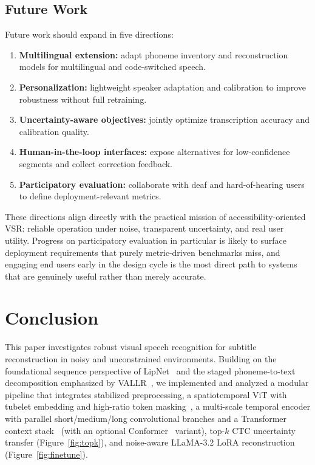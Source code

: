 \documentclass[10pt,twocolumn,letterpaper]{article}
\begin{document}
\subsection{Future Work}
Future work should expand in five directions:
\begin{enumerate}[leftmargin=*]
    \item \textbf{Multilingual extension:} adapt phoneme inventory and reconstruction models for multilingual and code-switched speech.
    \item \textbf{Personalization:} lightweight speaker adaptation and calibration to improve robustness without full retraining.
    \item \textbf{Uncertainty-aware objectives:} jointly optimize transcription accuracy and calibration quality.
    \item \textbf{Human-in-the-loop interfaces:} expose alternatives for low-confidence segments and collect correction feedback.
    \item \textbf{Participatory evaluation:} collaborate with deaf and hard-of-hearing users to define deployment-relevant metrics.
\end{enumerate}

These directions align directly with the practical mission of accessibility-oriented VSR: reliable operation under noise, transparent uncertainty, and real user utility. Progress on participatory evaluation in particular is likely to surface deployment requirements that purely metric-driven benchmarks miss, and engaging end users early in the design cycle is the most direct path to systems that are genuinely useful rather than merely accurate.

\section{Conclusion}
This paper investigates robust visual speech recognition for subtitle reconstruction in noisy and unconstrained environments. Building on the foundational sequence perspective of LipNet~\cite{assael2016lipnet} and the staged phoneme-to-text decomposition emphasized by VALLR~\cite{thomas2025vallr}, we implemented and analyzed a modular pipeline that integrates stabilized preprocessing, a spatiotemporal ViT with tubelet embedding and high-ratio token masking~\cite{tong2022videomae}, a multi-scale temporal encoder with parallel short/medium/long convolutional branches and a Transformer context stack~\cite{vaswani2017attention} (with an optional Conformer~\cite{conformer2020} variant), top-$k$ CTC uncertainty transfer (Figure~\ref{fig:topk}), and noise-aware LLaMA-3.2 LoRA reconstruction (Figure~\ref{fig:finetune}).
\end{document}
